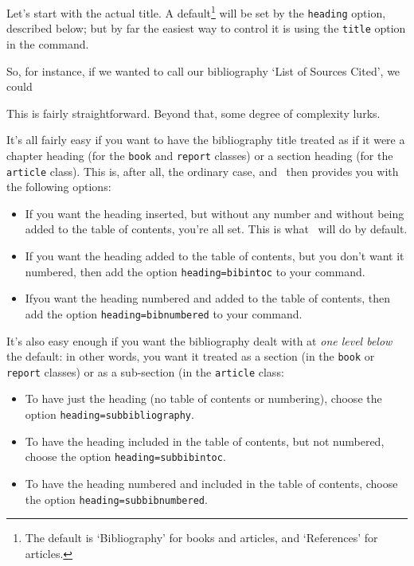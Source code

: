 Let's start with the actual title. A default\footnote{The default is
`Bibliography' for books and articles, and `References' for articles.} will be set by the
\verb|heading| option, described below; but by far the easiest way to
control it is using the \verb|title| option in the
 command.

So, for instance, if we wanted to call our bibliography `List of
Sources Cited', we could
\begin{center}
\end{center}

This is fairly straightforward. Beyond that, some degree of complexity
lurks.

It's all fairly easy if you want to have the bibliography title
treated as if it were a chapter heading (for the \verb|book| and
\verb|report| classes) or a section heading (for the \verb|article|
class). This is, after all, the ordinary case, and \biblatex\ then
provides you with the following options:
\begin{itemize}
\item If you want the heading inserted, but without any number and
  without being added to the table of contents, you're all set. This
  is what \biblatex\ will do by default.
\item If you want the heading added to the table of contents, but you
  don't want it numbered, then add the option \verb|heading=bibintoc|
  to your  command.
\item Ifyou want the heading numbered and added to the table of
  contents, then add the option \verb|heading=bibnumbered| to your
   command.
\end{itemize}

It's also easy enough if you want the bibliography dealt with at
\emph{one level below} the default: in other words, you want it
treated as a section (in the \verb|book| or \verb|report| classes) or
as a sub-section (in the \verb|article| class:
\begin{itemize}
\item To have just the heading (no table of contents or numbering),
  choose the option \verb|heading=subbibliography|.
\item To have the heading included in the table of contents, but not
  numbered, choose the option \verb|heading=subbibintoc|.
\item To have the heading numbered and included in the table of
  contents, choose the option \verb|heading=subbibnumbered|.
\end{itemize}

